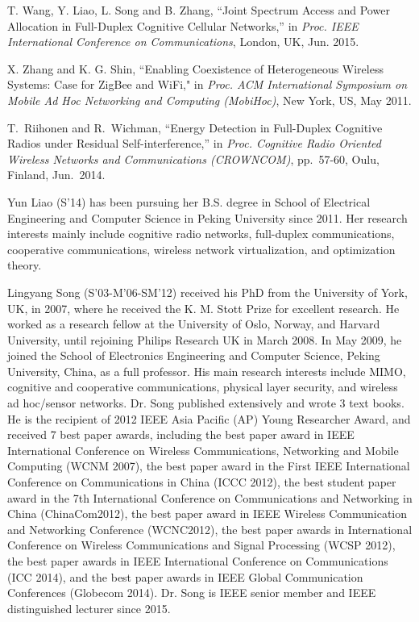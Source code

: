 \documentclass[onecolumn,12pt]{IEEEtran}
\begin{document}
\begin{thebibliography}{10}
T. Wang, Y. Liao, L. Song and B. Zhang, ``Joint Spectrum Access and Power Allocation in Full-Duplex Cognitive Cellular Networks,'' in \emph{Proc. IEEE International Conference on Communications}, London, UK, Jun. 2015.

X. Zhang and K. G. Shin, ``Enabling Coexistence of Heterogeneous Wireless Systems: Case for ZigBee and WiFi," in \emph{Proc. ACM International Symposium on Mobile Ad Hoc Networking and Computing (MobiHoc)}, New York, US, May 2011.

T.~Riihonen and R.~Wichman, ``Energy Detection in Full-Duplex Cognitive Radios under Residual Self-interference,'' in \emph{Proc. Cognitive Radio Oriented Wireless Networks and Communications (CROWNCOM)}, pp.~57-60, Oulu, Finland, Jun.~2014.
\end{thebibliography}

\newpage
\begin{biography}{Yun Liao}
(S'14) has been pursuing her B.S. degree in School of Electrical Engineering and Computer Science in Peking University since 2011. Her research interests mainly include cognitive radio networks, full-duplex communications, cooperative communications, wireless network virtualization, and optimization theory.
\end{biography}

\begin{biography}{Lingyang Song}
(S'03-M'06-SM'12) received his PhD from the University of York, UK, in 2007, where he received the K. M. Stott Prize for excellent research. He worked as a research fellow at the University of Oslo, Norway, and Harvard University, until rejoining Philips Research UK in March 2008. In May 2009, he joined the School of Electronics Engineering and Computer Science, Peking University, China, as a full professor. His main research interests include MIMO, cognitive and cooperative communications, physical layer security, and wireless ad hoc/sensor networks. Dr. Song published extensively and wrote 3 text books. He is the recipient of 2012 IEEE Asia Pacific (AP) Young Researcher Award, and received 7 best paper awards, including the best paper award in IEEE International Conference on Wireless Communications, Networking and Mobile Computing (WCNM 2007), the best paper award in the First IEEE International Conference on Communications in China (ICCC 2012), the best student paper award in the 7th International Conference on Communications and Networking in China (ChinaCom2012), the best paper award in IEEE Wireless Communication and Networking Conference (WCNC2012), the best paper awards in International Conference on Wireless Communications and Signal Processing (WCSP 2012), the best paper awards in IEEE International Conference on Communications (ICC 2014), and the best paper awards in IEEE Global  Communication Conferences (Globecom 2014). Dr. Song is IEEE senior member and IEEE distinguished lecturer since 2015.
\end{biography}
\end{document}
